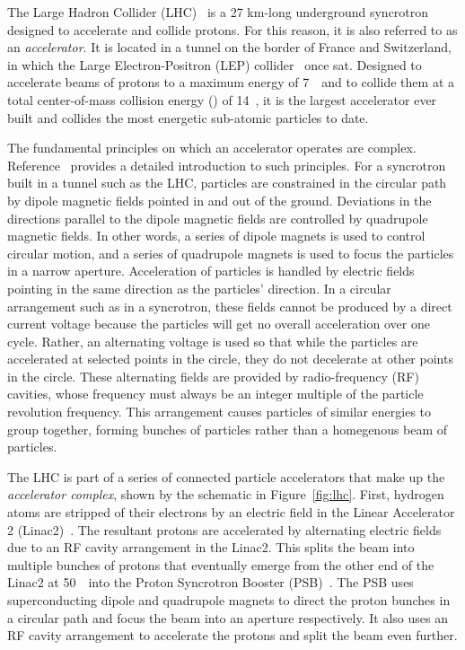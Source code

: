 \par The Large Hadron Collider (LHC)~\cite{Bruning:2004ej} is a 27 km-long underground 
syncrotron designed to accelerate and collide protons. For this reason, it is also 
referred to as an {\it accelerator}. It is located in a tunnel on the border of 
France and Switzerland, in which the Large Electron-Positron (LEP) 
collider~\cite{Myers:1991ym} once sat. Designed to accelerate
beams of protons to a maximum energy of 7~\TeV\ and to collide them at a total center-of-mass
collision energy (\sqs) of 14~\TeV, it is the largest accelerator ever built 
and collides the most energetic sub-atomic particles to date.

\par The fundamental principles on which an accelerator operates are complex. Reference~\cite{Wiedemann:1083415}
provides a detailed introduction to such principles. 
For a syncrotron built in a tunnel such as the LHC, particles are constrained in the circular path by
 dipole magnetic fields pointed in and out of the ground. Deviations in the directions 
parallel to the dipole magnetic fields are controlled by quadrupole magnetic fields. In other words, 
a series of dipole magnets is used to control circular motion, and a series of quadrupole magnets is 
used to focus the particles in a narrow aperture. Acceleration of particles is handled by electric fields 
pointing in the same direction as the particles' direction. In a circular arrangement such as in a syncrotron, 
these fields cannot be produced by a direct current voltage because the particles will get no overall 
acceleration over one cycle. Rather, an alternating voltage is used so that while the particles are accelerated 
at selected points in the circle, they do not decelerate at other points in the circle. These alternating 
fields are provided by radio-frequency (RF) cavities, whose frequency must always be an integer 
multiple of the particle revolution frequency. This arrangement causes particles of similar energies to 
group together, forming bunches of particles rather than a homegenous beam of particles.    

\par The LHC is part of a series of connected particle accelerators that make up the {\it accelerator 
complex}, shown by the schematic in Figure~\ref{fig:lhc}. First, hydrogen atoms are 
stripped of their electrons by an electric field in the Linear Accelerator
 2 (Linac2)~\cite{benedikt2004lhc}. The resultant protons are accelerated 
by alternating  electric fields due to an RF cavity arrangement in the Linac2. 
This splits the beam into multiple bunches of protons that eventually 
emerge from the other end of the Linac2 at 50~\MeV\ into the Proton Syncrotron Booster (PSB)~\cite{benedikt2004lhc}.  
The PSB uses superconducting dipole and quadrupole magnets to direct the proton bunches in a circular path 
and focus the beam into an aperture respectively. It also uses an RF cavity 
arrangement to accelerate the protons and split the beam even further. 

